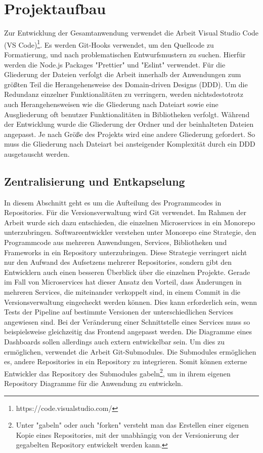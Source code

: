 \section{Projektaufbau}
\label{sec:projektaufbau}
Zur Entwicklung der Gesamtanwendung verwendet die Arbeit
Visual Studio Code (VS Code)\footnote{https://code.visualstudio.com/}. Es werden Git-Hooks
verwendet, um den Quellcode zu Formatierung, und nach problematischen Entwurfsmustern
zu suchen. Hierfür werden die Node.js Packages "Prettier" und "Eslint" verwendet.
Für die Gliederung der Dateien verfolgt die Arbeit innerhalb der Anwendungen zum größten Teil die Herangehensweise des
Domain-driven Designs (DDD). Um die Redundanz einzelner Funktionalitäten zu verringern, werden \mbox{nichtsdestotrotz} auch Herangehensweisen
wie die Gliederung nach Dateiart sowie eine Ausgliederung oft benutzer Funktionalitäten in Bibliotheken verfolgt. Während der Entwicklung
wurde die Gliederung der Ordner und der beinhalteten Dateien angepasst. Je nach Größe des Projekts wird eine andere Gliederung gefordert.
So muss die Gliederung nach Dateiart bei ansteigender Komplexität durch ein DDD ausgetauscht werden.

\subsection{Zentralisierung und Entkapselung}
\label{subsec:zentralisierungundentkapselung}
In diesem Abschnitt geht es um die Aufteilung des
Programmcodes in Repositories. Für die Versionsverwaltung
wird Git verwendet. Im Rahmen der Arbeit wurde sich dazu entschieden,
die einzelnen Microservices in ein Monorepo unterzubringen.
Softwareentwickler verstehen unter Monorepo eine Strategie, den Programmcode
aus mehreren Anwendungen, Services, Bibliotheken und Frameworks
in ein Repository unterzubringen.\cite{MonorepoTrunkBasedDevelopment}
Diese Strategie verringert nicht nur den Aufwand
des Aufsetzens mehrerer Repositories, sondern gibt den
Entwicklern auch einen besseren Überblick über die einzelnen
Projekte. Gerade im Fall von Microservices hat dieser
Ansatz den Vorteil, dass Änderungen in mehreren Services,
die miteinander verkoppelt sind, in einem Commit in die
Versionsverwaltung eingecheckt werden können. Dies kann erforderlich sein,
wenn Tests der Pipeline auf bestimmte Versionen der unterschiedlichen
Services angewiesen sind. Bei der Veränderung einer Schnittstelle eines Services
muss so beispielsweise gleichzeitig das Frontend angepasst werden.
Die Diagramme eines Dashboards sollen allerdings
auch extern entwickelbar sein. Um dies zu ermöglichen, verwendet
die Arbeit Git-Submodules.\cite{GitsubmodulesGitSCM} 
Die Submodules ermöglichen es, andere Repositories in ein
Repository zu integrieren. Somit können externe Entwickler das Repository des
Submodules gabeln\footnote{Unter "gabeln" oder auch "forken" versteht man
das Erstellen einer eigenen Kopie eines Repositories, mit der unabhängig von
der Versionierung der gegabelten Repository entwickelt werden kann.},
um in ihrem eigenen Repository Diagramme für die Anwendung zu entwickeln.

